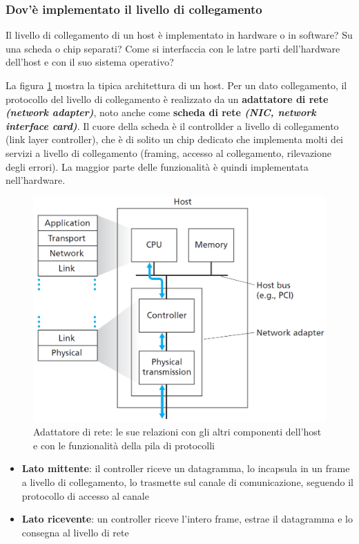 \documentclass[11pt,a4paper]{article}
\begin{document}
\subsubsection{Dov'è implementato il livello di collegamento}
Il livello di collegamento di un host è implementato in hardware o in software? Su una scheda o chip separati? Come si interfaccia con le latre parti dell'hardware dell'host e con il suo sistema operativo?

La figura \ref{fig: 069} mostra la tipica architettura di un host. Per un dato collegamento, il protocollo del livello di collegamento è realizzato da un \textbf{adattatore di rete \textit{(network adapter)}}, noto anche come \textbf{scheda di rete \textit{(NIC, network interface card)}}. Il cuore della scheda è il controllder a livello di collegamento (link layer controller), che è di solito un chip dedicato che implementa molti dei servizi a livello di collegamento (framing, accesso al collegamento, rilevazione degli errori). La maggior parte delle funzionalità è quindi implementata nell'hardware.
\begin{figure}
	\begin{center}
		\includegraphics[scale=0.6]{img/069.png}
		\caption{Adattatore di rete: le sue relazioni con gli altri componenti dell'host e con le funzionalità della pila di protocolli}
		\label{fig: 069}
	\end{center}
\end{figure}
\begin{itemize}
	\item \textbf{Lato mittente}: il controller riceve un datagramma, lo incapsula in un frame a livello di collegamento, lo trasmette sul canale di comunicazione, seguendo il protocollo di accesso al canale
	\item \textbf{Lato ricevente}: un controller riceve l'intero frame, estrae il datagramma e lo consegna al livello di rete
\end{itemize}
\end{document}
